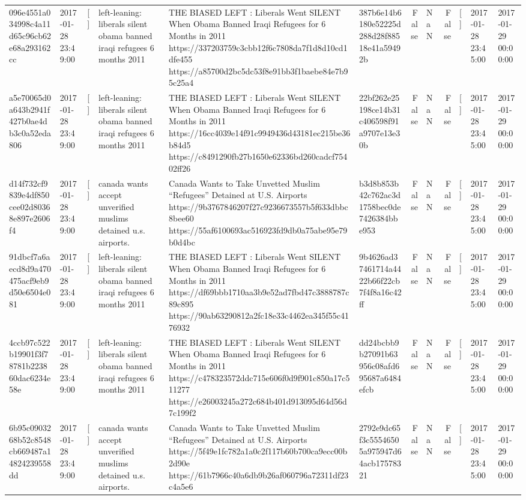 \begin{tabular}{llllllrlrlll}
096e4551a034998c4a11d65c96cb62e68a293162cc & 2017-01-28 23:49:00 & [] & left-leaning: liberals silent obama banned iraqi refugees 6 months 2011 & THE BIASED LEFT : Liberals Went SILENT When Obama Banned Iraqi Refugees for 6 Months in 2011 https://337203759c3cbb12f6c7808da7f1d8d10cd1dfe455 https://a85700d2bc5dc53f8e91bb3f1baebe84e7b95c25a4 & 387b6e14b6180e52225d288d28f88518e41a59492b & False & NaN & False & [] & 2017-01-28 23:45:00 & 2017-01-29 00:00:00 \\
a5e70065d0a643b2941f427b0ae4db3c0a52eda806 & 2017-01-28 23:49:00 & [] & left-leaning: liberals silent obama banned iraqi refugees 6 months 2011 & THE BIASED LEFT : Liberals Went SILENT When Obama Banned Iraqi Refugees for 6 Months in 2011 https://16cc4039e14f91c9949436d43181ec215be36b84d5 https://c8491290fb27b1650e62336bd260cadcf75402ff26 & 22bf262e25198ce14b31c406598f91a9707e13e30b & False & NaN & False & [] & 2017-01-28 23:45:00 & 2017-01-29 00:00:00 \\
d14f732cf9839e4df850cee02d80368e897e2606f4 & 2017-01-28 23:49:00 & [] & canada wants accept unverified muslims detained u.s. airports. & Canada Wants to Take Unvetted Muslim “Refugees” Detained at U.S. Airports https://9b3767846207f27c9236673557b5f633dbbc8bee60 https://55af6100693ac516923fd9db0a75abe95e79b0d4bc & b3d8b853b42c762ac3d1758bec0de7426384bbe953 & False & NaN & False & [] & 2017-01-28 23:45:00 & 2017-01-29 00:00:00 \\
91dbcf7a6aecd8d9a470475acf9eb9d50e6504e081 & 2017-01-28 23:49:00 & [] & left-leaning: liberals silent obama banned iraqi refugees 6 months 2011 & THE BIASED LEFT : Liberals Went SILENT When Obama Banned Iraqi Refugees for 6 Months in 2011 https://df69bbb1710aa3b9e52ad7fbd47c3888787c89c895 https://90ab63290812a2fc18e33c4462ea345f55c4176932 & 9b4626ad37461714a4422b66f22cb7f4f8a16c42ff & False & NaN & False & [] & 2017-01-28 23:45:00 & 2017-01-29 00:00:00 \\
4ccb97c522b19901f3f78781b223860dac6234e58e & 2017-01-28 23:49:00 & [] & left-leaning: liberals silent obama banned iraqi refugees 6 months 2011 & THE BIASED LEFT : Liberals Went SILENT When Obama Banned Iraqi Refugees for 6 Months in 2011 https://c478323572ddc715e606f0d9f901c850a17c511277 https://e26003245a272c684b401d913095d64d56d7c199f2 & dd24bcbb9b27091b63956c08afd695687a6484efcb & False & NaN & False & [] & 2017-01-28 23:45:00 & 2017-01-29 00:00:00 \\
6b95c0903268b52c8548cb669487a14824239558dd & 2017-01-28 23:49:00 & [] & canada wants accept unverified muslims detained u.s. airports. & Canada Wants to Take Unvetted Muslim “Refugees” Detained at U.S. Airports https://5f49e1fc782a1a0c2f117b60b700ca9ecc00b2d90e https://61b7966c40a6db9b26af060796a72311df23c4a5e6 & 2792e9dc65f3c55546505a975947d64acb17578321 & False & NaN & False & [] & 2017-01-28 23:45:00 & 2017-01-29 00:00:00 \\

\end{tabular}
